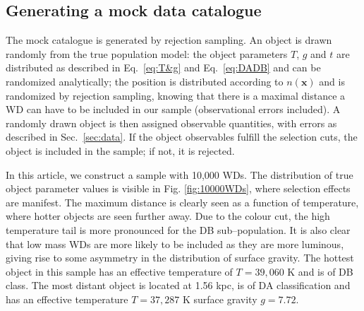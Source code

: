 \documentclass[fleqn,usenatbib]{mnras}
\newcommand{\Teff}{T}
\newcommand{\logg}{g}
\begin{document}
\subsection{Generating a mock data catalogue}

The mock catalogue is generated by rejection sampling. An object is drawn randomly from the true population model: the object parameters $\Teff$, $\logg$ and $t$ are distributed as described in Eq.~\eqref{eq:T&g} and Eq.~\eqref{eq:DADB} and can be randomized analytically; the position is distributed according to $n(\mathbf{x})$ and is randomized by rejection sampling, knowing that there is a maximal distance a WD can have to be included in our sample (observational errors included). A randomly drawn object is then assigned observable quantities, with errors as described in Sec.~\ref{sec:data}. If the object observables fulfill the selection cuts, the object is included in the sample; if not, it is rejected.

In this article, we construct a sample with 10,000 WDs. The distribution of true object parameter values is visible in Fig. \ref{fig:10000WDs}, where selection effects are manifest. The maximum distance is clearly seen as a function of temperature, where hotter objects are seen further away. Due to the colour cut, the high temperature tail is more pronounced for the DB sub--population. It is also clear that low mass WDs are more likely to be included as they are more luminous, giving rise to some asymmetry in the distribution of surface gravity. The hottest object in this sample has an effective temperature of $\Teff=39,060$ K and is of DB class. The most distant object is located at 1.56 kpc, is of DA classification and has an effective temperature $\Teff=37,287$ K surface gravity $\logg=7.72$.
\end{document}
